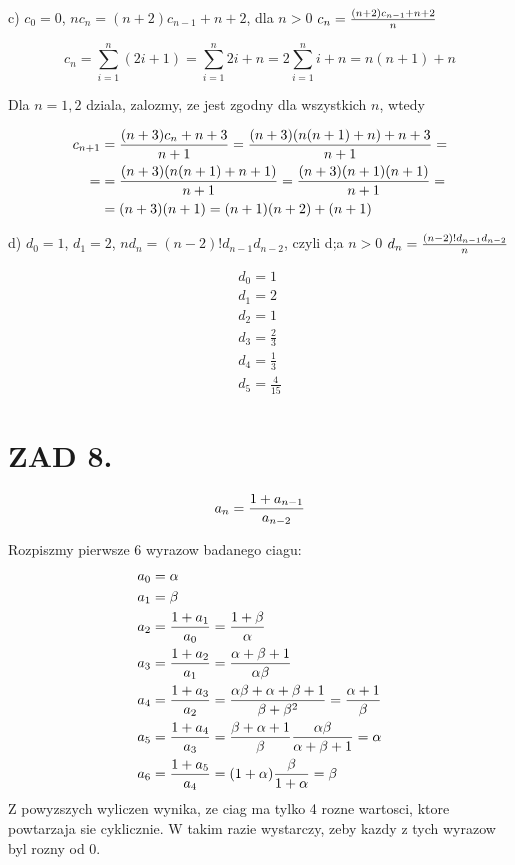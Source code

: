 \documentclass{article}[13pt]
\begin{document}
    \medskip

    c) $c_0=0$, $nc_n=(n+2)c_{n-1}+n+2$, dla $n>0$ $c_n={(n+2)c_{n-1}+n+2\over n}$

    $$c_n=\sum\limits_{i=1}^n(2i+1)=\sum\limits_{i=1}^n2i+n=2\sum\limits_{i=1}^ni+n=n(n+1)+n$$

    Dla $n=1,2$ dziala, zalozmy, ze jest zgodny dla wszystkich $n$, wtedy

    \begin{align*}
        c_{n+1}&={(n+3)c_n+n+3\over n+1}={(n+3)(n(n+1)+n)+n+3\over n+1}=\\=
        &={(n+3)(n(n+1)+n+1)\over n+1}={(n+3)(n+1)(n+1)\over n+1}=\\
        &=(n+3)(n+1)=(n+1)(n+2)+(n+1)
    \end{align*}

    \medskip

    d) $d_0=1$, $d_1=2$, $nd_n=(n-2)!d_{n-1}d_{n-2}$, czyli d;a $n>0$ $d_n={(n-2)!d_{n-1}d_{n-2}\over n}$

    \begin{align*}
        d_0=1\\
        d_1=2\\
        d_2=1\\
        d_3=\frac23\\
        d_4=\frac13\\
        d_5=\frac4{15}
    \end{align*}

    \section*{ZAD 8.}
    $$a_n={1+a_{n-1}\over a_{n-2}}$$
    
    Rozpiszmy pierwsze 6 wyrazow badanego ciagu:
    \begin{align*}
        a_0&=\alpha\\
        a_1&=\beta\\
        a_2&={1+a_1\over a_0}={1+\beta\over\alpha}\\
        a_3&={1+a_2\over a_1}={\alpha+\beta+1\over \alpha\beta}\\
        a_4&={1+a_3\over a_2}={\alpha\beta+\alpha+\beta+1\over\beta+\beta^2}={\alpha+1\over\beta}\\
        a_5&={1+a_4\over a_3}={\beta+\alpha+1\over\beta}{\alpha\beta\over\alpha+\beta+1}=\alpha\\
        a_6&={1+a_5\over a_4}=(1+\alpha){\beta\over1+\alpha}=\beta
    \end{align*}
    Z powyzszych wyliczen wynika, ze ciag ma tylko 4 rozne wartosci, ktore powtarzaja sie cyklicznie. W takim razie wystarczy, zeby kazdy z tych wyrazow byl rozny od 0. 
    \medskip
    
\end{document}
